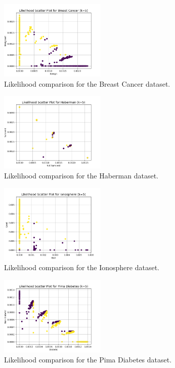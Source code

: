 \documentclass[conference]{IEEEtran}
\begin{document}
\begin{figure}[htbp]
    \centering
    \includegraphics[width=0.45\textwidth]{../scripts/comparison_results/Breast Cancer_likelihoodk5.png}
    \caption{Likelihood comparison for the Breast Cancer dataset.}
    \label{fig:breast_cancer_likelihood}
\end{figure}

\begin{figure}[htbp]
    \centering
    \includegraphics[width=0.45\textwidth]{../scripts/comparison_results/Haberman_likelihoodk5.png}
    \caption{Likelihood comparison for the Haberman dataset.}
    \label{fig:haberman_likelihood}
\end{figure}

\begin{figure}[htbp]
    \centering
    \includegraphics[width=0.45\textwidth]{../scripts/comparison_results/Ionosphere_likelihoodk5.png}
    \caption{Likelihood comparison for the Ionosphere dataset.}
    \label{fig:ionosphere_likelihood}
\end{figure}

\begin{figure}[htbp]
    \centering
    \includegraphics[width=0.45\textwidth]{../scripts/comparison_results/Pima Diabetes_likelihoodk5.png}
    \caption{Likelihood comparison for the Pima Diabetes dataset.}
    \label{fig:pima_diabetes_likelihood}
\end{figure}
\end{document}
